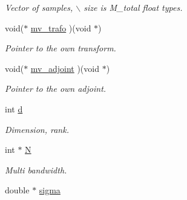 \begin{CompactItemize}
\begin{CompactList}\small\item\em Vector of samples, $\backslash$ size is M\_\-total float types. \item\end{CompactList}\item 
\hypertarget{structnfft__plan_9ebd66f2964cca6a02fc50d640df3557}{
void($\ast$ \hyperlink{structnfft__plan_9ebd66f2964cca6a02fc50d640df3557}{mv\_\-trafo} )(void $\ast$)}
\label{structnfft__plan_9ebd66f2964cca6a02fc50d640df3557}

\begin{CompactList}\small\item\em Pointer to the own transform. \item\end{CompactList}\item 
\hypertarget{structnfft__plan_bbe724645c96ef34c3e98d821f6648a3}{
void($\ast$ \hyperlink{structnfft__plan_bbe724645c96ef34c3e98d821f6648a3}{mv\_\-adjoint} )(void $\ast$)}
\label{structnfft__plan_bbe724645c96ef34c3e98d821f6648a3}

\begin{CompactList}\small\item\em Pointer to the own adjoint. \item\end{CompactList}\item 
\hypertarget{structnfft__plan_e39d4867eac948d96abbe3fc930b39a8}{
int \hyperlink{structnfft__plan_e39d4867eac948d96abbe3fc930b39a8}{d}}
\label{structnfft__plan_e39d4867eac948d96abbe3fc930b39a8}

\begin{CompactList}\small\item\em Dimension, rank. \item\end{CompactList}\item 
\hypertarget{structnfft__plan_307fb9647dee8b4a6acbd1ab26f67fa9}{
int $\ast$ \hyperlink{structnfft__plan_307fb9647dee8b4a6acbd1ab26f67fa9}{N}}
\label{structnfft__plan_307fb9647dee8b4a6acbd1ab26f67fa9}

\begin{CompactList}\small\item\em Multi bandwidth. \item\end{CompactList}\item 
\hypertarget{structnfft__plan_09340f6465c23f3d94636f4f0da30f8a}{
double $\ast$ \hyperlink{structnfft__plan_09340f6465c23f3d94636f4f0da30f8a}{sigma}}
\label{structnfft__plan_09340f6465c23f3d94636f4f0da30f8a}


\end{CompactItemize}
